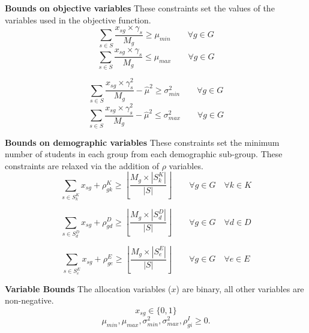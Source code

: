 \documentclass[12pt]{ORSNZ}
\begin{document}
\begin{description}
\textbf{Bounds on objective variables} These constraints set the values of the variables used in the objective function.
\begin{equation} \label{minu}
\sum_{s \in S} \frac{x_{sg}\times \gamma_s}{M_g} \geq \mu_{min} \qquad \mbox{$\forall g \in G$}
\end{equation}
\begin{equation} \label{maxu}
\sum_{s \in S} \frac{x_{sg}\times \gamma_s}{M_g} \leq \mu_{max} \qquad \mbox{$\forall g \in G$}
\end{equation}

\begin{equation} \label{minv}
\sum_{s \in S} \frac{x_{sg}\times \gamma_s^2}{M_g}  - \hat{\mu}^2 \geq \sigma^2_{min} \qquad\mbox{$\forall g \in G$}
\end{equation}
\begin{equation} \label{maxv}
\sum_{s \in S} \frac{x_{sg}\times \gamma_s^2}{M_g}  - \hat{\mu}^2 \leq \sigma^2_{max} \qquad\mbox{$\forall g \in G$}
\end{equation}


\textbf{Bounds on demographic variables} These constraints set the minimum number of students in each group from each demographic sub-group. These constraints are relaxed via the addition of $\rho$ variables.
\begin{equation} \label{con2}
\sum_{s \in S^K_k} x_{sg} + \rho^K_{gk} \geq \left\lfloor\frac{M_g\times |S^K_k|}{|S|}\right\rfloor \qquad \mbox{$\forall g \in G \quad \forall k \in K$}
\end{equation}

\begin{equation} \label{con2}
\sum_{s \in S^D_d} x_{sg} + \rho^D_{gd}  \geq \left\lfloor\frac{M_g\times |S^D_d|}{|S|}\right\rfloor \qquad \mbox{$\forall g \in G \quad \forall d \in D$}
\end{equation}

\begin{equation} \label{con2}
\sum_{s \in S^E_e} x_{sg} + \rho^E_{ge}  \geq \left\lfloor\frac{M_g\times |S^E_e|}{|S|}\right\rfloor \qquad \mbox{$\forall g \in G \quad \forall e \in E$}
\end{equation}

\textbf{Variable Bounds} The allocation variables ($x$) are binary, all other variables are non-negative.
\[x_{sg} \in \{0, 1\}\]
\[\mu_{min}, \mu_{max}, \sigma^2_{min}, \sigma^2_{max}, \rho^I_{gi}  \ge 0.\]

\end{description}
\end{document}
